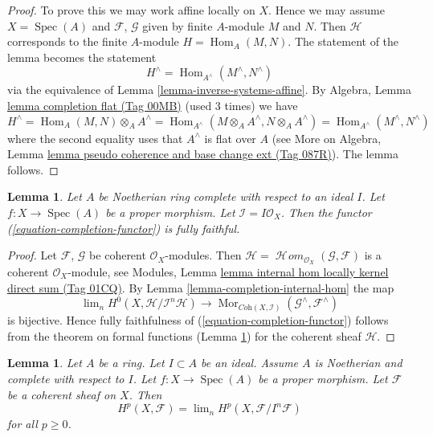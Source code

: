 \documentclass{amsart}
\theoremstyle{plain}
\newtheorem{lemma}[subsection]{Lemma}
\theoremstyle{definition}
\theoremstyle{remark}
\numberwithin{equation}{subsection}
\def\lim{\mathop{\mathrm{lim}}\nolimits}
\def\Spec{\mathop{\mathrm{Spec}}}
\def\Hom{\mathop{\mathrm{Hom}}\nolimits}
\def\SheafHom{\mathop{\mathcal{H}\!\mathit{om}}\nolimits}
\def\Mor{\mathop{\mathrm{Mor}}\nolimits}
\begin{document}
\begin{proof}
To prove this we may work affine locally on $X$.
Hence we may assume $X = \Spec(A)$ and $\mathcal{F}$, $\mathcal{G}$
given by finite $A$-module $M$ and $N$. Then $\mathcal{H}$
corresponds to the finite $A$-module $H = \Hom_A(M, N)$.
The statement of the lemma becomes the statement
$$
H^\wedge = \Hom_{A^\wedge}(M^\wedge, N^\wedge)
$$
via the equivalence of Lemma \ref{lemma-inverse-systems-affine}.
By Algebra, Lemma \href{https://stacks.math.columbia.edu/tag/00MB}{lemma completion flat (Tag 00MB)}
(used 3 times) we have
$$
H^\wedge = \Hom_A(M, N) \otimes_A A^\wedge =
\Hom_{A^\wedge}(M \otimes_A A^\wedge, N \otimes_A A^\wedge) =
\Hom_{A^\wedge}(M^\wedge, N^\wedge)
$$
where the second equality uses that $A^\wedge$ is flat over $A$
(see More on Algebra, Lemma
\href{https://stacks.math.columbia.edu/tag/087R}{lemma pseudo coherence and base change ext (Tag 087R)}).
The lemma follows.
\end{proof}


\begin{lemma}
\label{lemma-fully-faithful}
Let $A$ be Noetherian ring complete with respect to an ideal $I$.
Let $f : X \to \Spec(A)$ be a proper morphism. Let
$\mathcal{I} = I\mathcal{O}_X$.
Then the functor (\ref{equation-completion-functor}) is fully faithful.
\end{lemma}

\begin{proof}
Let $\mathcal{F}$, $\mathcal{G}$ be coherent $\mathcal{O}_X$-modules.
Then $\mathcal{H} = \SheafHom_{\mathcal{O}_X}(\mathcal{G}, \mathcal{F})$
is a coherent $\mathcal{O}_X$-module, see
Modules, Lemma \href{https://stacks.math.columbia.edu/tag/01CQ}{lemma internal hom locally kernel direct sum (Tag 01CQ)}.
By Lemma \ref{lemma-completion-internal-hom} the map
$$
\lim_n H^0(X, \mathcal{H}/\mathcal{I}^n\mathcal{H})
\to
\Mor_{\textit{Coh}(X, \mathcal{I})}
(\mathcal{G}^\wedge, \mathcal{F}^\wedge)
$$
is bijective. Hence fully faithfulness of
(\ref{equation-completion-functor}) follows from the theorem on formal
functions (Lemma \ref{lemma-spell-out-theorem-formal-functions})
for the coherent sheaf $\mathcal{H}$.
\end{proof}


\begin{lemma}
\label{lemma-spell-out-theorem-formal-functions}
Let $A$ be a ring. Let $I \subset A$ be an ideal. Assume $A$ is
Noetherian and complete with respect to $I$.
Let $f : X \to \Spec(A)$ be a proper morphism.
Let $\mathcal{F}$ be a coherent sheaf on $X$.
Then
$$
H^p(X, \mathcal{F}) = \lim_n H^p(X, \mathcal{F}/I^n\mathcal{F})
$$
for all $p \geq 0$.
\end{lemma}
\end{document}
